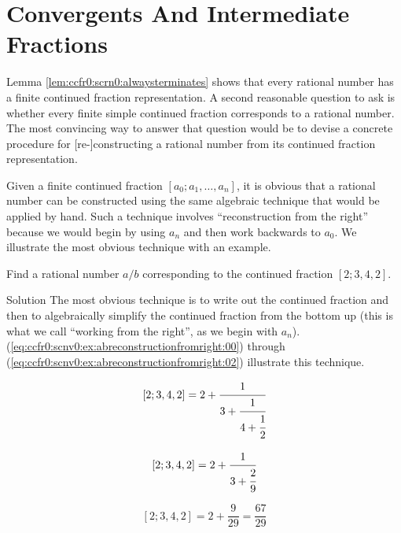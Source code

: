 \section{Convergents And Intermediate Fractions}
\label{ccfr0:scnf0}

Lemma \ref{lem:ccfr0:scrn0:alwaysterminates} shows that every 
rational number has a finite continued fraction representation.  A second
reasonable question to ask is whether every finite simple continued
fraction corresponds to a rational number.  The most convincing way
to answer that question would be to devise a concrete procedure for 
[re-]constructing a rational number from its continued fraction
representation.

Given a finite continued fraction $[a_0; a_1, \ldots{}, a_n]$, it is
obvious that a rational number can be constructed using the same
algebraic technique that would be applied by hand.  Such a technique
involves ``reconstruction from the right'' because we would begin
by using $a_n$ and then work backwards to $a_0$.  We illustrate
the most obvious technique with an example.

\begin{vworkexamplestatement}
\label{ex:ccfr0:scnv0:abreconstructionfromright:01}
Find a rational number $a/b$ corresponding to the
continued fraction $[2;3,4,2]$.
\end{vworkexamplestatement}
\begin{vworkexampleparsection}{Solution}
The most obvious technique is to write out the continued fraction and then to
algebraically simplify the continued fraction from the bottom up (this
is what we call ``working from the right'', as we begin with $a_n$).
(\ref{eq:ccfr0:scnv0:ex:abreconstructionfromright:00}) through 
(\ref{eq:ccfr0:scnv0:ex:abreconstructionfromright:02}) 
illustrate this technique.

\begin{equation}
\label{eq:ccfr0:scnv0:ex:abreconstructionfromright:00}
[2;3,4,2] =
2 + \cfrac{1}{3 + \cfrac{1}{4 + \cfrac{1}{2}}}
\end{equation}

\begin{equation}
\label{eq:ccfr0:scnv0:ex:abreconstructionfromright:01}
[2;3,4,2] =
2 + \cfrac{1}{3 + \cfrac{2}{9}}
\end{equation}

\begin{equation}
\label{eq:ccfr0:scnv0:ex:abreconstructionfromright:02}
[2;3,4,2] =
2 + \frac{9}{29} = \frac{67}{29}
\end{equation}

\end{vworkexampleparsection}
\vworkexamplefooter{}

